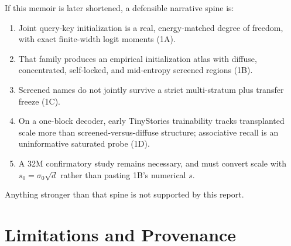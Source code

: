 \documentclass[11pt,a4paper]{report}
\begin{document}
If this memoir is later shortened, a defensible narrative spine is:
\begin{enumerate}[leftmargin=*]
  \item Joint query-key initialization is a real, energy-matched degree of freedom, with exact finite-width logit moments (1A).
  \item That family produces an empirical initialization atlas with diffuse, concentrated, self-locked, and mid-entropy screened regions (1B).
  \item Screened names do not jointly survive a strict multi-stratum plus transfer freeze (1C).
  \item On a one-block decoder, early TinyStories trainability tracks transplanted scale more than screened-versus-diffuse structure; associative recall is an uninformative saturated probe (1D).
  \item A 32M confirmatory study remains necessary, and must convert scale with $s_0=\sigma_0\sqrt{d}$ rather than pasting 1B's numerical $s$.
\end{enumerate}
Anything stronger than that spine is not supported by this report.

\chapter{Limitations and Provenance}
\label{ch:limitations}
\end{document}
